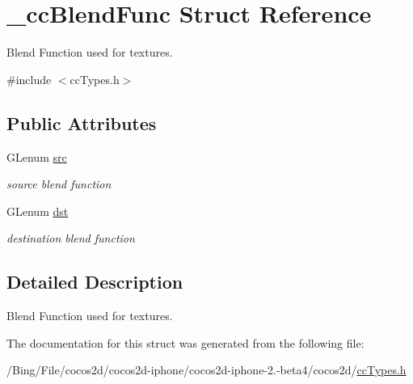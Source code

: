 \hypertarget{struct__cc_blend_func}{\section{\-\_\-cc\-Blend\-Func Struct Reference}
\label{struct__cc_blend_func}
}


Blend Function used for textures.  




{\ttfamily \#include $<$cc\-Types.\-h$>$}

\subsection*{Public Attributes}
\begin{DoxyCompactItemize}
\item 
\hypertarget{struct__cc_blend_func_a42eec7fdd463ecabe04cae2825e45d9b}{G\-Lenum \hyperlink{struct__cc_blend_func_a42eec7fdd463ecabe04cae2825e45d9b}{src}}\label{struct__cc_blend_func_a42eec7fdd463ecabe04cae2825e45d9b}

\begin{DoxyCompactList}\small\item\em source blend function \end{DoxyCompactList}\item 
\hypertarget{struct__cc_blend_func_ac0d691604ae447b1229658ba4fb8b07a}{G\-Lenum \hyperlink{struct__cc_blend_func_ac0d691604ae447b1229658ba4fb8b07a}{dst}}\label{struct__cc_blend_func_ac0d691604ae447b1229658ba4fb8b07a}

\begin{DoxyCompactList}\small\item\em destination blend function \end{DoxyCompactList}\end{DoxyCompactItemize}


\subsection{Detailed Description}
Blend Function used for textures. 

The documentation for this struct was generated from the following file\-:\begin{DoxyCompactItemize}
\item 
/\-Bing/\-File/cocos2d/cocos2d-\/iphone/cocos2d-\/iphone-\/2.-\/beta4/cocos2d/\hyperlink{cc_types_8h}{cc\-Types.\-h}\end{DoxyCompactItemize}
